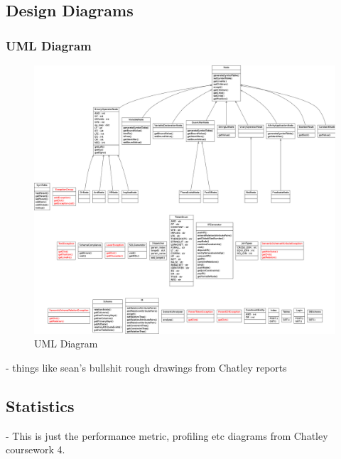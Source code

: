 \documentclass[a4paper, 11pt]{article}
\begin{document}
  \subsection{Design Diagrams}
    \subsubsection{UML Diagram}
    \begin{figure}[H]
        \includegraphics[width=1.0\textwidth]{images/umlisloveley.png}
        \caption{UML Diagram}
      \end{figure}

  - things like sean's bullshit rough drawings from Chatley reports

  \subsection{Statistics}

  - This is just the performance metric, profiling etc diagrams from 
  Chatley coursework 4.
\end{document}
